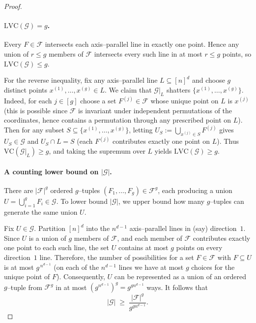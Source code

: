\documentclass[arxiv]{colt2026}
\newcommand{\F}{\mathcal{F}}
\newcommand{\G}{\mathcal{G}}
\newcommand{\VC}{\mathrm{VC}}
\newcommand{\LVC}{\mathrm{LVC}}
\begin{document}
\begin{proof}
\paragraph{$\LVC(\G)=g$.}
Every $F\in\F$ intersects each axis--parallel line in exactly one point.
Hence any union of $r\le g$ members of $\F$ intersects every such line in at
most $r\le g$ points, so $\LVC(\G)\le g$.

For the reverse inequality, fix any axis--parallel line $L\subseteq [n]^d$ and
choose $g$ distinct points $x^{(1)},\ldots,x^{(g)}\in L$.
We claim that $\G|_{L}$ shatters $\{x^{(1)},\ldots,x^{(g)}\}$.
Indeed, for each $j\in[g]$ choose a set $F^{(j)}\in\F$ whose unique point on $L$
is $x^{(j)}$ (this is possible since $\F$ is invariant under independent
permutations of the coordinates, hence contains a permutation through any
prescribed point on $L$).
Then for any subset $S\subseteq \{x^{(1)},\ldots,x^{(g)}\}$, letting
$U_S:=\bigcup_{x^{(j)}\in S} F^{(j)}$ gives $U_S\in\G$ and
$U_S\cap L = S$ (each $F^{(j)}$ contributes exactly one point on $L$).
Thus $\VC(\G|_{L})\ge g$, and taking the supremum over $L$ yields $\LVC(\G)\ge g$.

\paragraph{A counting lower bound on $|\G|$.}
There are $|\F|^g$ ordered $g$--tuples $(F_1,\ldots,F_g)\in\F^g$, each producing
a union $U=\bigcup_{i=1}^g F_i\in\G$.
To lower bound $|\G|$, we upper bound how many $g$--tuples can generate the same
union $U$.

Fix $U\in\G$.
Partition $[n]^d$ into the $n^{d-1}$ axis--parallel lines in (say) direction~$1$.
Since $U$ is a union of $g$ members of $\F$, and each member of $\F$ contributes
exactly one point to each such line, the set $U$ contains at most $g$ points on
every direction~$1$ line.
Therefore, the number of possibilities for a set $F\in\F$ with $F\subseteq U$ is
at most $g^{\,n^{d-1}}$ (on each of the $n^{d-1}$ lines we have at most $g$ choices
for the unique point of $F$).
Consequently, $U$ can be represented as a union of an ordered $g$--tuple from
$\F^g$ in at most $(g^{n^{d-1}})^g = g^{g n^{d-1}}$ ways.
It follows that
\begin{equation}
\label{eq:G-count}
|\G|
\;\ge\;
\frac{|\F|^g}{g^{g n^{d-1}}}.
\end{equation}


\end{proof}
\end{document}
